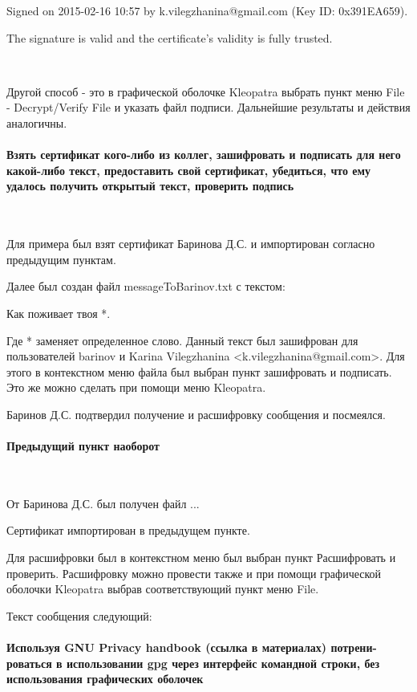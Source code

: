 \documentclass{article}
\begin{document}
Signed on 2015-02-16 10:57 by k.vilegzhanina@gmail.com (Key ID: 0x391EA659).

The signature is valid and the certificate's validity is fully trusted.

~

Другой способ - это в графической оболочке Kleopatra выбрать пункт меню File - Decrypt/Verify File и указать файл подписи. Дальнейшие результаты и действия аналогичны.

\paragraph{Взять сертификат кого-либо из коллег, зашифровать и подписать для него какой-либо текст, предоставить свой сертификат, убедиться, что ему удалось получить открытый текст, проверить подпись}
~

Для примера был взят сертификат Баринова Д.С. и импортирован согласно предыдущим пунктам.

Далее был создан файл messageToBarinov.txt с текстом:

Как поживает твоя *.

Где * заменяет определенное слово. Данный текст был зашифрован для пользователей barinov и Karina Vilegzhanina <k.vilegzhanina@gmail.com>. Для этого в контекстном меню файла был выбран пункт зашифровать и подписать. Это же можно сделать при помощи меню Kleopatra.

Баринов Д.С. подтвердил получение и расшифровку сообщения и посмеялся.

\paragraph{Предыдущий пункт наоборот}
~

От Баринова Д.С. был получен файл ...

Сертификат импортирован в предыдущем пункте.

Для расшифровки был в контекстном меню был выбран пункт Расшифровать и проверить. Расшифровку можно провести также и при помощи графической оболочки Kleopatra выбрав соответствующий пункт меню File.

Текст сообщения следующий:

\paragraph{Используя GNU Privacy handbook (ссылка в материалах) потрени-роваться в использовании gpg через интерфейс командной строки,
без использования графических оболочек}
~
\end{document}
